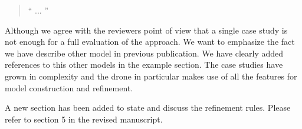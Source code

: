 \documentclass{response}
\begin{document}
\begin{response}
  \begin{quote}
    `` ...
   ''
  \end{quote}
\end{response}
 



\begin{comment}{Reviewer \#2}
The paper introduces a technique for the refinement of `run to completion' 
statechart modelling notation (using SCXML language) while preserving safety 
properties. The statechart specification is translated to event-B formalism, 
allowing for formal verification using a theorem prover. The proposed approach 
is demonstrated using a statechart specification of a drone.

Positive points:
+ Interesting topic
+ Technique well motivated
+ The paper is well written and easy to read.

Negative points:
- One single case study is not enough to validate the proposed approach. The 
statechart specification of the drone is rather small. More elaborated models 
are required to validate the proposed approach.
\end{comment}

\begin{response}
Although we agree with the reviewers point of view that a single case study is
not enough for a full evaluation of the approach. We want to emphasize the fact
we have describe other model in previous publication. We have clearly added
references to this other models in the example section. The case studies have
grown in complexity and the drone in particular makes use of all the features
for model construction and refinement.
\end{response}


\begin{comment}{Reviewer \#2}
General comments:
  - The three refinement rules listed in the introduction have not been 
  described explicitly in the rest of the paper. Please describe them (using 
  minimal examples) in section 3.
\end{comment}

\begin{response}
A new section has been added to state and discuss the refinement rules. 
Please refer to section 5 in the revised manuscript.
\end{response}
\end{document}
